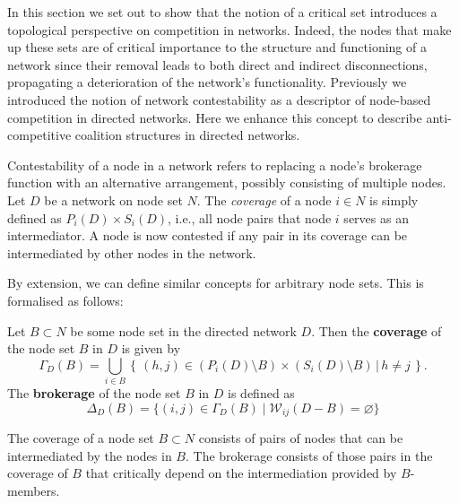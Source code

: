 In this section we set out to show that the notion of a critical set introduces a topological perspective on competition in networks. Indeed, the nodes that make up these sets are of critical importance to the structure and functioning of a network since their removal leads to both direct and indirect disconnections, propagating a deterioration of the network's functionality. Previously we introduced the notion of network contestability as a descriptor of node-based competition in directed networks. Here we enhance this concept to describe anti-competitive coalition structures in directed networks.

Contestability of a node in a network refers to replacing a node's brokerage function with an alternative arrangement, possibly consisting of multiple nodes. Let $D$ be a network on node set $N$. The \emph{coverage} of a node $i \in N$ is simply defined as $P_{i}(D) \times S_{i}(D)$, i.e., all node pairs that node $i$ serves as an intermediator. A node is now contested if any pair in its coverage can be intermediated by other nodes in the network.

By extension, we can define similar concepts for arbitrary node sets. This is formalised as follows:
\begin{definition}
Let $B \subset N$ be some node set in the directed network $D$. Then the \textbf{coverage} of the node set $B$ in $D$ is given by
\begin{equation} \label{eq:coverageSet}
\Gamma_D (B) =\bigcup_{i \in B} \left\{ \left. \, (h,j) \in ( P_{i} \left( D \right) \setminus B ) \times \left( S_{i} \left( D \right) \setminus B \right) \, \right| \, h \neq j \, \right\}.
\end{equation}
The \textbf{brokerage} of the node set $B$ in $D$ is defined as
\begin{equation}
\Delta_D (B) = \{ (i,j) \in \Gamma_D (B) \mid \mathcal{W}_{ij} (D-B) = \varnothing \}
\end{equation}
\end{definition}
The coverage of a node set $B \subset N$ consists of pairs of nodes that can be intermediated by the nodes in $B$. The brokerage consists of those pairs in the coverage of $B$ that critically depend on the intermediation provided by $B$-members. 

